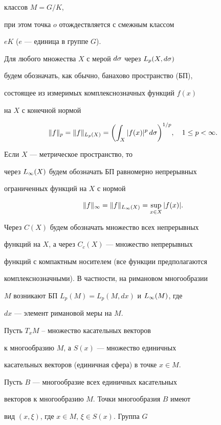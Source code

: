 классов $M=G/K$,


при этом точка $o$ отождествляется с смежным классом


$eK$ ($e$ --- единица в группе $G$).





Для любого множества $X$ с мерой $d\sigma$ через $L_p(X,d\sigma)$


будем обозначать, как обычно, банахово пространство (БП),


состоящее из измеримых комплекснозначных функций $f(x)$


на $X$ с конечной нормой


$$


\|f\|_p=\|f\|_{L_p(X)}=\bbl\int_X |f(x)|^p\,d\si\bbr^{1/p},


\quad 1\le p<\8.


$$


Если $X$ --- метрическое пространство, то


через $L_\infty(X)$ будем обозначать БП равномерно непрерывных


ограниченных функций на $X$ с нормой


$$


\|f\|_\8=\|f\|_{L_\8(X)}=\sup_{x\in X}|f(x)|.


$$


Через $C(X)$ будем обозначать множество всех непрерывных


функций на $X$, а через $C_c(X)$ --- множество непрерывных


функций с компактным носителем (все функции предполагаются


комплекснозначными). В частности, на римановом многообразии


$M$ возникают БП $L_p(M)=L_p(M,dx)$ и $L_\infty(M)$, где


$dx$ --- элемент римановой меры на $M$.





Пусть $T_xM$ -- множество касательных векторов


к многообразию $M$, а $S(x)$ --- множество единичных


касательных векторов (единичная сфера) в точке $x\in M$.


Пусть $B$ --- многообразие всех единичных касательных


векторов к многообразию $M$. Точки многообразия $B$ имеют


вид $(x,\xi)$, где $x\in M$, $\xi\in S(x)$. Группа $G$


